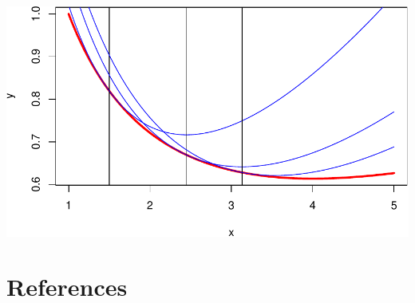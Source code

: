 \documentclass[
  12pt,
]{article}
\begin{document}
\begin{center}\includegraphics{smacofManual_files/figure-latex/majplot-1} \end{center}

\section*{References}\label{references}
\end{document}
